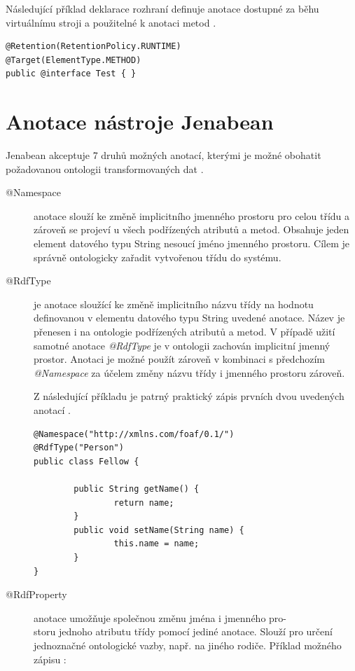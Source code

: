 \documentclass{projekt}
\begin{document}
Následující příklad deklarace rozhraní definuje anotace dostupné za běhu virtuálnímu stroji a použitelné k anotaci metod \cite{jedenact}.

\begin{verbatim}
@Retention(RetentionPolicy.RUNTIME)
@Target(ElementType.METHOD)
public @interface Test { }
\end{verbatim}

\section{Anotace nástroje Jenabean}
\hspace{0.65cm}Jenabean akceptuje 7 druhů možných anotací, kterými je možné obohatit požadovanou ontologii transformovaných dat \cite{deset}.

\begin{description}
\item[@Namespace] \indent anotace slouží ke změně implicitního jmenného prostoru pro celou třídu a zároveň se projeví u všech podřízených atributů a metod. Obsahuje jeden element  datového typu String nesoucí jméno jmenného prostoru. Cílem je správně ontologicky zařadit vytvořenou třídu do systému.
\item[@RdfType] je anotace sloužící ke změně implicitního názvu třídy na hodnotu definovanou v elementu datového typu String uvedené anotace. Název je přenesen i na ontologie podřízených atributů a metod. V případě užití samotné anotace {\it @RdfType} je v ontologii zachován implicitní jmenný prostor. Anotaci je možné použít zároveň v kombinaci s předchozím {\it @Namespace} za účelem změny názvu třídy i jmenného prostoru zároveň.

Z následující příkladu je patrný praktický zápis prvních dvou uvedených anotací \cite{deset}.

\begin{verbatim}
@Namespace("http://xmlns.com/foaf/0.1/")
@RdfType("Person")
public class Fellow {
        
        public String getName() {
                return name;
        }
        public void setName(String name) {
                this.name = name;
        }
}
\end{verbatim}

\item[@RdfProperty]anotace umožňuje společnou změnu jména i jmenného pro-\\storu jednoho atributu třídy pomocí jediné anotace. Slouží pro určení jednoznačné ontologické vazby, např. na jiného rodiče. Příklad možného zápisu \cite{deset}:\\


\end{description}
\end{document}
